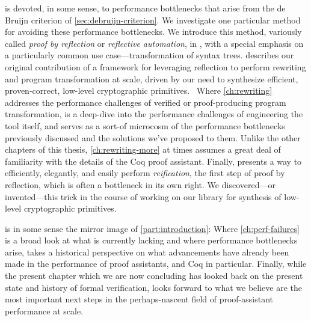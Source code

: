  is devoted, in some sense, to performance bottlenecks that arise from the de Bruijn criterion of \autoref{sec:debruijn-criterion}.
We investigate one particular method for avoiding these performance bottlenecks.
We introduce this method, variously called \emph{proof by reflection} or \emph{reflective automation}, in , with a special emphasis on a particularly common use case---transformation of syntax trees.
 describes our original contribution of a framework for leveraging reflection to perform rewriting and program transformation at scale, driven by our need to synthesize efficient, proven-correct, low-level cryptographic primitives.~\cite{FiatCryptoSP19}
Where \autoref{ch:rewriting} addresses the performance challenges of verified or proof-producing program transformation,  is a deep-dive into the performance challenges of engineering the tool itself, and serves as a sort-of microcosm of the performance bottlenecks previously discussed and the solutions we've proposed to them.
Unlike the other chapters of this thesis, \autoref{ch:rewriting-more} at times assumes a great deal of familiarity with the details of the Coq proof assistant.
Finally,  presents a way to efficiently, elegantly, and easily perform \emph{reification}, the first step of proof by reflection, which is often a bottleneck in its own right.
We discovered---or invented---this trick in the course of working on our library for synthesis of low-level cryptographic primitives.~\cite{FiatCryptoSP19,reification-by-parametricity}

 is in some sense the mirror image of \autoref{part:introduction}:
Where \autoref{ch:perf-failures} is a broad look at what is currently lacking and where performance bottlenecks arise,  takes a historical perspective on what advancements have already been made in the performance of proof assistants, and Coq in particular.
Finally, while the present chapter which we are now concluding has looked back on the present state and history of formal verification,  looks forward to what we believe are the most important next steps in the perhaps-nascent field of proof-assistant performance at scale.

